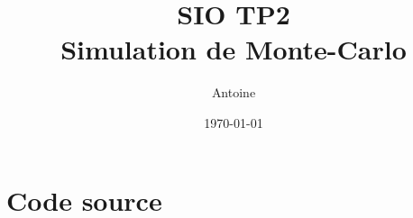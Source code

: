 \documentclass[11pt,a4paper,twoside,svgnames]{article}
\title{\color{Chocolate}\huge\bfseries SIO TP2\\Simulation de Monte-Carlo}
\author{Antoine \bsc{Friant}}
\date{\today}
\begin{document}
\maketitle

\section{Code source}

%
%
%
%
%
\end{document}
